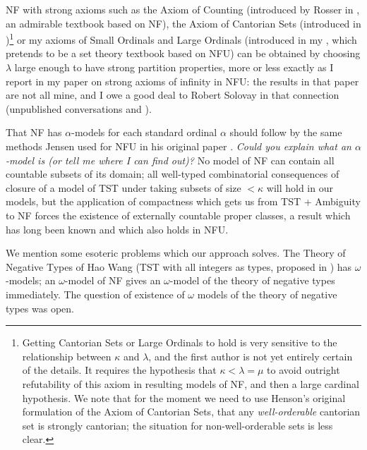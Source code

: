 \documentclass[112pt]{article}
\theoremstyle{definition}
\theoremstyle{remark}
\newcommand{\rk}[1]{{\color{blue}\sl #1}}
\begin{document}
NF with strong axioms such as the Axiom of Counting (introduced by Rosser in \cite{rosser}, an admirable textbook based on NF), the Axiom of Cantorian Sets (introduced in \cite{henson})\footnote{Getting Cantorian Sets or Large Ordinals to hold is very sensitive to the relationship between $\kappa$ and $\lambda$, and the first author is not yet entirely certain of the details.  It requires the hypothesis that $\kappa<\lambda=\mu$ to avoid outright refutability of this axiom in resulting models of NF, and then a large cardinal hypothesis.  We note that for the moment we need to use Henson's original formulation of the Axiom of Cantorian Sets, that any {\em well-orderable\/} cantorian set is strongly cantorian;  the situation for non-well-orderable sets is less clear.} or my axioms of Small Ordinals and Large Ordinals (introduced in  my \cite{mybook}, which pretends to be a set theory textbook based on NFU) can be obtained by choosing $\lambda$ large enough to have strong partition properties, more or less exactly as I report in my paper \cite{strongaxioms} on strong axioms of infinity in NFU:  the results in that paper are not all mine, and I owe a good deal to Robert Solovay in that connection (unpublished conversations and \cite{nfub}).

That NF has $\alpha$-models for each standard ordinal $\alpha$ should follow by the same methods Jensen used for NFU in his original paper \cite{nfu}.  \rk{Could you explain what an $\alpha$-model is (or tell me where I can find out)?}   No model of NF can contain all countable subsets of its domain;  all well-typed combinatorial consequences
of closure of a model of TST under taking subsets of size $<\kappa$ will hold in our models, but the application of compactness which gets us from TST + Ambiguity to NF forces the existence of externally countable proper classes, a result which has long been known and which also holds in NFU.

We mention some esoteric problems which our approach solves.  The Theory of Negative Types of Hao Wang (TST with all integers as types, proposed in \cite{tnt})  has $\omega$-models;  an $\omega$-model of NF gives an $\omega$-model of the theory of negative types  immediately.  The question of existence of $\omega$ models of the theory of negative types was open.
\end{document}
